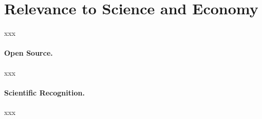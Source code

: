 \section{Relevance to Science and Economy}

xxx

\paragraph{Open Source.}
xxx

\paragraph{Scientific Recognition.}
xxx